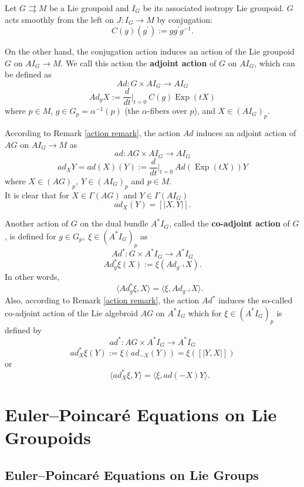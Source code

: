 \documentclass{article}
\begin{document}
Let $ G \rightrightarrows M $ be a Lie groupoid and $I_{G}$ be its associated isotropy Lie groupoid. $G$ acts smoothly from the left on $ J: I_{G} \longrightarrow M $ by conjugation: $$ C(g) (g^{\prime} ):= g g^{\prime} g^{-1}.$$

On the other hand, the conjugation action induces an action of the Lie groupoid $G$ on $ A I_{G} \longrightarrow M $. We call this action the \textbf{adjoint action} of $G$ on $A I_{G}$, which can be defined as 
 $$Ad: G \times A I_{G} \longrightarrow AI_{G} $$
 $$Ad_{g} X := \dfrac{d}{dt} \Big\vert_{t=0}~ C(g) \operatorname{Exp} (tX)$$
where $p \in M$, $g \in G_{p} = \alpha^{-1} (p)$ (the $\alpha$-fibers over $p$), and $X \in (A I_{G})_p.$

According to Remark \ref{action remark}, the action $Ad$ induces an adjoint action of $AG $ on $ A I_{G}  \longrightarrow M $ as 
$$ad: AG \times AI_G \to AI_G$$
$$ ad_X Y = ad (X) (Y) := \dfrac{d}{dt} \Big\vert_{t=0}~ Ad (\operatorname{Exp} (tX) ) Y $$
where $ X \in (AG)_{p} ,~ Y \in (A I_{G})_{p}$ and $ p \in M.$ \\
It is clear that for $ X \in \Gamma(AG) $ and $Y \in  \Gamma(A I_{G} )$
$$ ad_X (Y) = [\vert X , Y \vert].$$ 

Another action of $G$ on the dual bundle $A^{\ast} I_{G} $, called the \textbf{co-adjoint action} of $G$, is defined for $ g \in G_{p},~ \xi \in (A^{\ast} I_{G})_p$ as 
$$ Ad^{\ast} : G \times A^{\ast} I_{G} \longrightarrow A^{\ast} I_{G}  $$
$$ Ad_{g} ^{\ast} \xi (X) := \xi ( Ad_{g^{-1}} X ).  $$
In other words, $$ ~~~~~~~~\langle Ad_{g} ^{\ast} \xi , X \rangle = \langle \xi , Ad_{g^{-1}} X\rangle. $$
Also, according to Remark \ref{action remark}, the action $Ad^{\ast}$ induces the so-called co-adjoint action of the Lie algebroid $AG$ on $A^{\ast} I_{G} $ which for $ \xi \in (A^{\ast} I_{G})_p $ is defined by
$$ ad^{\ast} : AG \times A^{\ast} I_{G}  \longrightarrow A^{\ast} I_{G} $$
$$ ad_{X} ^{\ast} \xi (Y) := \xi ( ad_{-X} (Y) ) = \xi ( [\vert Y,X \vert] ) $$
or $$ ~~~~~~~~\langle ad_{X} ^{\ast} \xi , Y  \rangle = \langle \xi , ad (-X) Y \rangle. $$

\section{Euler--Poincar\'e Equations on Lie Groupoids}
\subsection{Euler--Poincar\'e Equations on Lie Groups}
\end{document}
